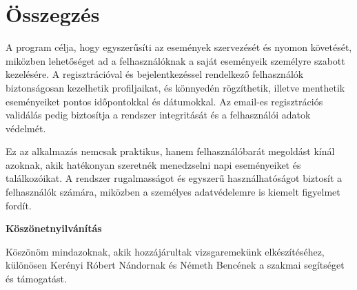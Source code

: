 \documentclass[colorlinks]{thesis-kando}
\theoremstyle{definition}
\theoremstyle{remark}
\begin{document}
 
\chapter*{Összegzés}

A program célja, hogy egyszerűsíti az események szervezését és nyomon követését, miközben lehetőséget ad a felhasználóknak a saját eseményeik személyre szabott kezelésére. A regisztrációval és bejelentkezéssel rendelkező felhasználók biztonságosan kezelhetik profiljaikat, és könnyedén rögzíthetik, illetve menthetik eseményeiket pontos időpontokkal és dátumokkal. Az email-es regisztrációs validálás pedig biztosítja a rendszer integritását és a felhasználói adatok védelmét.

Ez az alkalmazás nemcsak praktikus, hanem felhasználóbarát megoldást kínál azoknak, akik hatékonyan szeretnék menedzselni napi eseményeiket és találkozóikat. A rendszer rugalmasságot és egyszerű használhatóságot biztosít a felhasználók számára, miközben a személyes adatvédelemre is kiemelt figyelmet fordít.




\Huge\begin{center}
	\textbf{Köszönetnyilvánítás}	
\end{center}\normalsize
Köszönöm mindazoknak, akik hozzájárultak vizsgaremekünk elkészítéséhez, különösen Kerényi Róbert Nándornak és Németh Bencének a szakmai segítséget és támogatást.
\newline\newline
\end{document}
